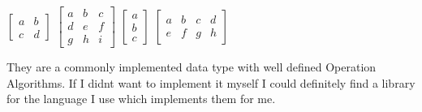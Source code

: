 \begin{flushleft}
                    \begin{center}
                        $\begin{bmatrix}
                            a & b\\
                            c & d
                        \end{bmatrix}$ 
                        $\begin{bmatrix}
                            a & b & c \\
                            d & e & f \\
                            g & h & i 
                        \end{bmatrix}$ 
                        $\begin{bmatrix}
                            a \\
                            b \\
                            c  
                        \end{bmatrix}$ 
                        $\begin{bmatrix}
                            a & b & c & d\\
                            e & f & g & h
                        \end{bmatrix}$ 
                    \end{center}   

                    They are a commonly implemented data type with well defined Operation Algorithms. If I didnt want to implement
                    it myself I could definitely find a library for the language I use which implements them for me.

\end{flushleft}
